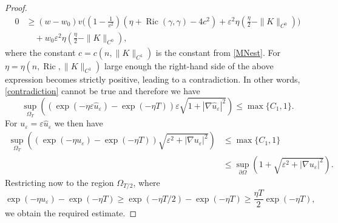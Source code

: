 \documentclass[11pt]{amsart}
\renewcommand{\epsilon}{\varepsilon}
\DeclareMathOperator{\Ric}{Ric}    \DeclareMathOperator{\Rm}{Rm}
\def\e{\epsilon}
\begin{document}
\begin{proof}
\begin{equation*}
\begin{split}
0&\geq (w-w_0)v\Bigg(\left(1-\frac{1}{v^2}\right)\left({\eta}+\Ric(\gamma,\gamma)-4c^2\right)+\varepsilon^2\eta\left(\frac{\eta}{2}-\|K\|_{C^0}\right)\Bigg)\\
&\quad+w_0\varepsilon^2\eta\left(\frac{\eta}{2}-\|K\|_{C^0}\right),
\end{split}
\end{equation*}
where the constant $c=c(n, \|K\|_{C^1})$ is the constant from \eqref{MNest}. For $\eta=\eta(n,\Ric,\|K\|_{C^1})$ large enough the right-hand side of the above expression becomes  strictly positive, leading to a contradiction. In other words, \eqref{contradiction} cannot be true and therefore we have
\[\sup_{\Omega_T}((\exp(-\eta \varepsilon\hat{u}_\e)-\exp(-\eta T))\varepsilon\sqrt{1+|\nabla \hat{u}_\e|^2})\le\max\{C_1,1\}.\]
For $u_\e=\e\hat u_\e$ we then have
\[\begin{split}\sup_{\Omega_T}((\exp(-\eta{u}_\e)-\exp(-\eta T))\sqrt{\e^2+|\nabla {u}_\e|^2})&\le\max\{C_1,1\}\\
&\le \sup_{\partial\Omega}(1+\sqrt{\e^2+|\nabla {u}_\e|^2}).
\end{split}\]
Restricting now to the region $\Omega_{T/2}$, where 
\[\exp(-\eta{u}_\e)-\exp(-\eta T)\ge \exp(-\eta T/2)-\exp(-\eta T)\ge \frac{\eta T}{2}\exp(-\eta T),\]
we obtain  the required estimate.
\end{proof}
\end{document}
